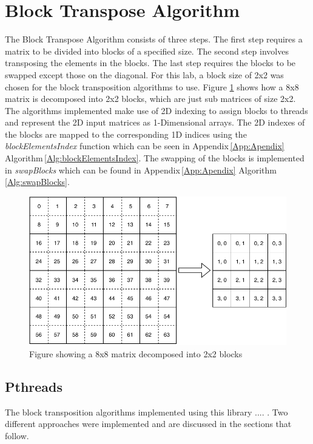 \documentclass[10pt, onecolumn]{article}
\begin{document}
\section{Block Transpose Algorithm}
%
The Block Transpose Algorithm consists of three steps. The first step requires a matrix to be divided into blocks of a specified size. The second step involves transposing the elements in the blocks. The last step requires the blocks to be swapped except those on the diagonal. For this lab, a block size of 2x2 was chosen for the block transposition algorithms to use. Figure \ref{fig:BlockDecomposition} shows how a 8x8 matrix is decomposed into 2x2 blocks, which are just sub matrices of size 2x2. The algorithms implemented make use of 2D indexing to assign blocks to threads and represent the 2D input matrices as 1-Dimensional arrays. The 2D indexes of the blocks are mapped to the corresponding 1D indices using the \emph{blockElementsIndex} function which can be seen in Appendix\,\ref{App:Apendix} Algorithm\,\ref{Alg:blockElementsIndex}. The swapping of the blocks is implemented in \emph{swapBlocks} which can be found in Appendix\,\ref{App:Apendix} Algorithm\,\ref{Alg:swapBlocks}.
%
\begin{figure}[H]
    \centering
    \includegraphics[scale=0.7]{Documentation/BlockDecomposition.pdf}
    \caption{Figure showing a 8x8 matrix decomposed into 2x2 blocks}
    \label{fig:BlockDecomposition}
\end{figure}
%
\subsection{Pthreads}
%
The block transposition algorithms implemented using this library .... . Two different approaches were implemented and are discussed in the sections that follow.
%
\end{document}
